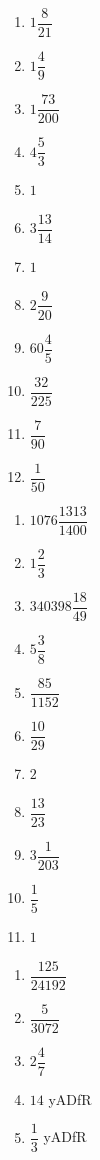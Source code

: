 
\begin{multicols}{4}
\begin{enumerate}[$(1)$]
\item $1 \dfrac{8}{21}$
\item $1\dfrac{4}{9}$
\item $1 \dfrac{73}{200}$ 
\item $4\dfrac{5}{3}$
\item $1$ 
\item $3 \dfrac{13}{14}$
\item $1$
\item $2\dfrac{9}{20}$
\item $60 \dfrac{4}{5}$
\item $\dfrac{32}{225}$
\item $\dfrac{7}{90}$
\item $\dfrac{1}{50}$ 
\end{enumerate}
\end{multicols}


\begin{multicols}{4}
\begin{enumerate}[$(1)$]
\item $1076\dfrac{1313}{1400}$
\item $1\dfrac{2}{3}$
\item $340398 \dfrac{18}{49}$
\item $5\dfrac{3}{8}$
\item $\dfrac{85}{1152}$
\item $\dfrac{10}{29}$ 
\item $2 $
\item $\dfrac{13}{23}$
\item $3\dfrac{1}{203}$ 
\item $\dfrac{1}{5}$ 
\item $1$
\end{enumerate}
\end{multicols}


\begin{multicols}{3}
\begin{enumerate}[$(1)$]
\item $\dfrac{125}{24192}$ 
\item $\dfrac{5}{3072}$ 
\item $2\dfrac{4}{7}$
\item $14$ yADfR 
\item $\dfrac{1}{3}$ yADfR
\end{enumerate}
\end{multicols}

